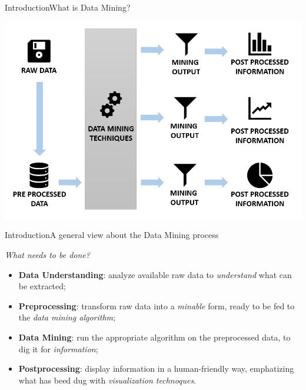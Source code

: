 \begin{frame}{Introduction}{What is Data Mining?}

\noindent\begin{centering}
\includegraphics[scale=0.32]{img1_noback.png}
\end{centering}

\end{frame}

\begin{frame}{Introduction}{A general view about the Data Mining process}

    \centering\textit{What needs to be done?} \vspace{0,3cm}

	\begin{block}{}
		\begin{itemize}
			\item<1-> \textbf{Data Understanding}: analyze available raw data to \emph{understand} what can be extracted;
			\item<2-> \textbf{Preprocessing}: transform raw data into a \emph{minable} form, ready to be fed to the \emph{data mining algorithm};
			\item<3-> \textbf{Data Mining}: run the appropriate algorithm on the preprocessed data, to dig it for \emph{information};
			\item<4-> \textbf{Postprocessing}: display information in a human-friendly way, emphatizing what has beed dug with \emph{visualization technoques}.
		\end{itemize}
	\end{block}

\end{frame}

